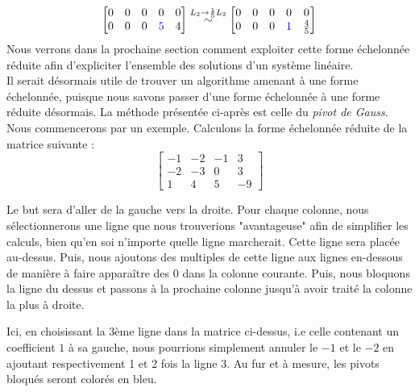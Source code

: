 \begin{align*}
\begin{bmatrix}
0 & 0 & 0 & 0 & 0 \\
0 & 0 & 0 & \color{blue}5 & 4
\end{bmatrix}
\overset{L_2 \to \frac{1}{5}L_2}{\sim}
\begin{bmatrix}
0 & 0 & 0 & 0 & 0 \\
0 & 0 & 0 & \color{blue}1 & \frac{4}{5}
\end{bmatrix}
\end{align*}
Nous verrons dans la prochaine section comment exploiter cette forme échelonnée réduite afin d'expliciter l'ensemble des solutions d'un système linéaire.\\

\noindent Il serait désormais utile de trouver un algorithme amenant à une forme échelonnée, puisque nous savons passer d'une forme échelonnée à une forme réduite désormais. La méthode présentée ci-après est celle du \textit{pivot de Gauss}.\\

\noindent Nous commencerons par un exemple. Calculons la forme échelonnée réduite de la matrice suivante :
$$\begin{bmatrix}
-1 & -2 & -1 & 3 \\
-2 & -3 &  0 & 3 \\
1  &  4 &  5 & -9
\end{bmatrix}
$$
\begin{mdframed}
Le but sera d'aller de la gauche vers la droite. Pour chaque colonne, nous sélectionnerons une ligne que nous trouverions "avantageuse" afin de simplifier les calculs, bien qu'en soi n'importe quelle ligne marcherait. Cette ligne sera placée au-dessus. Puis, nous ajoutons des multiples de cette ligne aux lignes en-dessous de manière à faire apparaître des 0 dans la colonne courante. Puis, nous bloquons la ligne du dessus et passons à la prochaine colonne jusqu'à avoir traité la colonne la plus à droite.
\end{mdframed}

\noindent Ici, en choisissant la 3ème ligne dans la matrice ci-dessus, i.e celle contenant un coefficient $1$ à sa gauche, nous pourrions simplement annuler le $-1$ et le $-2$ en ajoutant respectivement 1 et 2 fois la ligne 3. Au fur et à mesure, les pivots bloqués seront colorés en bleu.\\

